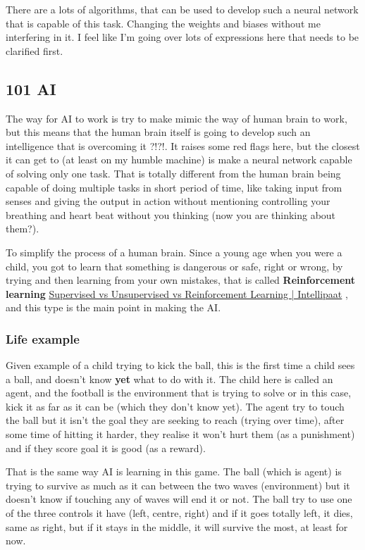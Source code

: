 There are a lots of algorithms, that can be used to develop such a neural network that is capable of this task. Changing the weights and biases without me interfering in it. I feel like I'm going over lots of expressions here that needs to be clarified first.

\subsection{101 AI}\label{101-ai}
The way for AI to work is try to make mimic the way of human brain to work, but this means that the human brain itself is going to develop such an intelligence that is overcoming it ?!?!. It raises some red flags here, but the closest it can get to (at least on my humble machine) is make a neural network capable of solving only one task. That is totally different from the human brain being capable of doing multiple tasks in short period of time, like taking input from senses and giving the output in action without mentioning controlling your breathing and heart beat without you thinking (now you are thinking about them?).

To simplify the process of a human brain. Since a young age when you were a child, you got to learn that something is dangerous or safe, right or wrong, by trying and then learning from your own mistakes, that is called \textbf{Reinforcement learning} \href{https://intellipaat.com/blog/supervised-learning-vs-unsupervised-learning-vs-reinforcement-learning/}{Supervised vs Unsupervised vs Reinforcement Learning | Intellipaat} , and this type is the main point in making the AI.

\subsubsection{Life example}
Given example of a child trying to kick the ball, this is the first time a child sees a ball, and doesn't know \textbf{yet} what to do with it. The child here is called an agent, and the football is the environment that is trying to solve or in this case, kick it as far as it can be (which they don't know yet). The agent try to touch the ball but it isn't the goal they are seeking to reach (trying over time), after some time of hitting it harder, they realise it won't hurt them (as a punishment) and if they score goal it is good (as a reward). 

That is the same way AI is learning in this game. The ball (which is agent) is trying to survive as much as it can between the two waves (environment) but it doesn't know if touching any of waves will end it or not. The ball try to use one of the three controls it have (left, centre, right) and if it goes totally left, it dies, same as right, but if it stays in the middle, it will survive the most, at least for now.

